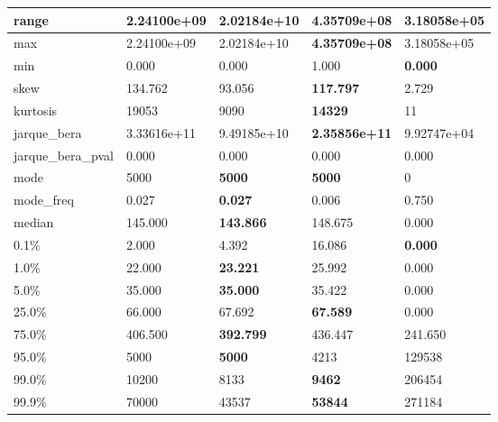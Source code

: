 \begin{table}[H]
\begin{tabular}{|l|m{10em}|m{10em}|m{10em}|m{10em}|}
\hline range & 2.24100e+09 & \cellcolor[rgb]{0.9, 0.54, 0.52} 2.02184e+10 & \bfseries 4.35709e+08 & 3.18058e+05 \\
\hline max & 2.24100e+09 & \cellcolor[rgb]{0.9, 0.54, 0.52} 2.02184e+10 & \bfseries 4.35709e+08 & 3.18058e+05 \\
\hline min & 0.000 & 0.000 & \cellcolor[rgb]{0.9, 0.54, 0.52} 1.000 & \bfseries 0.000 \\
\hline skew & 134.762 & 93.056 & \bfseries 117.797 & \cellcolor[rgb]{0.9, 0.54, 0.52} 2.729 \\
\hline kurtosis & 19053 & 9090 & \bfseries 14329 & \cellcolor[rgb]{0.9, 0.54, 0.52} 11 \\
\hline jarque\_bera & 3.33616e+11 & 9.49185e+10 & \bfseries 2.35856e+11 & \cellcolor[rgb]{0.9, 0.54, 0.52} 9.92747e+04 \\
\hline jarque\_bera\_pval & 0.000 & 0.000 & 0.000 & 0.000 \\
\hline mode & 5000 & \bfseries 5000 & \bfseries 5000 & \cellcolor[rgb]{0.9, 0.54, 0.52} 0 \\
\hline mode\_freq & 0.027 & \bfseries 0.027 & 0.006 & \cellcolor[rgb]{0.9, 0.54, 0.52} 0.750 \\
\hline median & 145.000 & \bfseries 143.866 & 148.675 & \cellcolor[rgb]{0.9, 0.54, 0.52} 0.000 \\
\hline 0.1\% & 2.000 & 4.392 & \cellcolor[rgb]{0.9, 0.54, 0.52} 16.086 & \bfseries 0.000 \\
\hline 1.0\% & 22.000 & \bfseries 23.221 & 25.992 & \cellcolor[rgb]{0.9, 0.54, 0.52} 0.000 \\
\hline 5.0\% & 35.000 & \bfseries 35.000 & 35.422 & \cellcolor[rgb]{0.9, 0.54, 0.52} 0.000 \\
\hline 25.0\% & 66.000 & 67.692 & \bfseries 67.589 & \cellcolor[rgb]{0.9, 0.54, 0.52} 0.000 \\
\hline 75.0\% & 406.500 & \bfseries 392.799 & 436.447 & \cellcolor[rgb]{0.9, 0.54, 0.52} 241.650 \\
\hline 95.0\% & 5000 & \bfseries 5000 & 4213 & \cellcolor[rgb]{0.9, 0.54, 0.52} 129538 \\
\hline 99.0\% & 10200 & 8133 & \bfseries 9462 & \cellcolor[rgb]{0.9, 0.54, 0.52} 206454 \\
\hline 99.9\% & 70000 & 43537 & \bfseries 53844 & \cellcolor[rgb]{0.9, 0.54, 0.52} 271184 \\
\hline
\end{tabular}
\end{table}
